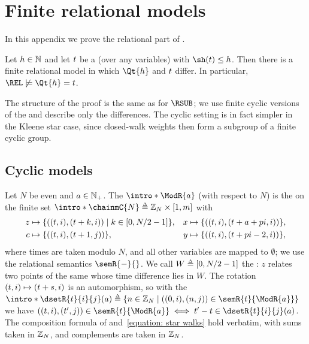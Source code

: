 \section{Finite relational models}\label{section: appendix: rel}

In this appendix we prove the relational part of .
\begin{theorem}\label{theorem: main REL}
    Let $h \in \mathbb{N}$ and let $\term$ be a  (over any variables) with $\sh(\term) \le h$.
    Then there is a finite relational model in which $\Qt{h}$ and $\term$ differ. In particular, $\REL \not\models \Qt{h} = \term$.
\end{theorem}
The structure of the proof is the same as for $\RSUB$; we use finite cyclic versions of the  and describe only the differences.
The cyclic setting is in fact simpler in the Kleene star case, since closed-walk weights then form a subgroup of a finite cyclic group.

\subsection{Cyclic models}
\AP Let $N$ be even and $a \in \mathbb{N}_{+}$.
The  $\intro*\ModR{a}$ (with respect to $N$) is the  on the finite set $\intro*\chainmC{N} \defeq \inte_N \times \range{1, m}$ with
\begin{align*}
    z &\mapsto \{((t, i), (t+k, i)) \mid k \in [0, N/2 - 1]\}, &
    x &\mapsto \{((t, i), (t + a + p i, i))\}, \\
    c &\mapsto \{((t, i), (t+1, j))\}, &
    y &\mapsto \{((t, i), (t + p i - 2, i))\},
\end{align*}
where times are taken modulo $N$, and all other variables are mapped to $\emptyset$; we use the relational semantics $\semR{\bl}{}$.
\AP We call $W \defeq \range{0, N/2 - 1}$ the : $z$ relates two points of the same  whose time difference lies in $W$.
The rotation $(t, i) \mapsto (t + s, i)$ is an automorphism, so with the 
$\intro*\dsetR{\term}{i}{j}(a) \defeq \set{n \in \inte_N \mid (\pt{0}{i}, \pt{n}{j}) \in \semR{\term}{\ModR{a}}}$
we have $(\pt{t}{i}, \pt{t'}{j}) \in \semR{\term}{\ModR{a}} \iff t' - t \in \dsetR{\term}{i}{j}(a)$.
The composition formula of  and~\eqref{equation: star walks} hold verbatim, with sums taken in $\mathbb{Z}_N$, and complements are taken in $\mathbb{Z}_N$.

